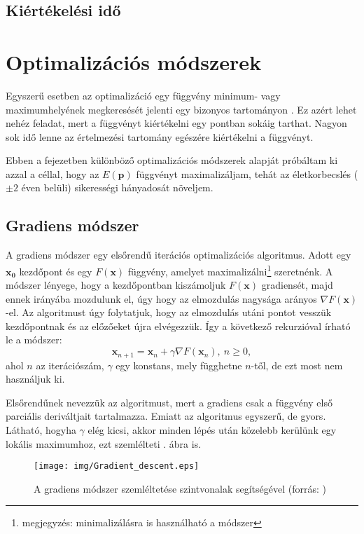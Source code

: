 \documentclass[12pt]{article}
\begin{document}
\subsection{Kiértékelési idő}


\section{Optimalizációs módszerek}
Egyszerű esetben az optimalizáció egy függvény minimum- vagy maximumhelyének megkeresését jelenti egy bizonyos tartományon \cite{Holder}. \iffalse TODO: példa a prog opt.-ról? \fi Ez azért lehet nehéz feladat, mert a függvényt kiértékelni egy pontban sokáig tarthat. Nagyon sok idő lenne az értelmezési tartomány egészére kiértékelni a függvényt.

Ebben a fejezetben különböző optimalizációs módszerek alapját próbáltam ki azzal a céllal, hogy az $E(\mathbf{p})$ függvényt maximalizáljam, tehát az életkorbecslés ($\pm 2$ éven belüli) sikerességi hányadosát növeljem.
\subsection{Gradiens módszer}
A gradiens módszer \cite{gradient1, gradient2} egy elsőrendű iterációs optimalizációs algoritmus. Adott egy $\mathbf{x_0}$ kezdőpont és egy $F(\mathbf{x})$ függvény, amelyet maximalizálni\footnote{megjegyzés: minimalizálásra is használható a módszer} szeretnénk. A módszer lényege, hogy a kezdőpontban kiszámoljuk $F(\mathbf{x})$ gradiensét, majd ennek irányába mozdulunk el, úgy hogy az elmozdulás nagysága arányos $\nabla F(\mathbf{x})$-el.
Az algoritmust úgy folytatjuk, hogy az elmozdulás utáni pontot vesszük kezdőpontnak és az előzőeket újra elvégezzük.
Így a következő rekurzióval írható le a módszer:
\begin{equation}
	\mathbf {x}_{n+1}=\mathbf {x}_{n}+\gamma\nabla F(\mathbf {x}_{n}),\ n\geq 0,
\end{equation}
ahol $n$ az iterációszám, $\gamma$ egy konstans, mely függhetne $n$-től, de ezt most nem használjuk ki. 

Elsőrendűnek nevezzük az algoritmust, mert a gradiens csak a függvény első parciális deriváltjait tartalmazza. Emiatt az algoritmus egyszerű, de gyors. Látható, hogyha $\gamma$ elég kicsi, akkor minden lépés után közelebb kerülünk egy lokális maximumhoz, ezt szemlélteti . ábra is.
\begin{figure}[H]
	\centering
	\texttt{[image: img/Gradient\_descent.eps]}
	\caption{A gradiens módszer szemléltetése szintvonalak segítségével (forrás: \cite{grad_wiki})}
	\label{grad_contour}
\end{figure}
\end{document}
